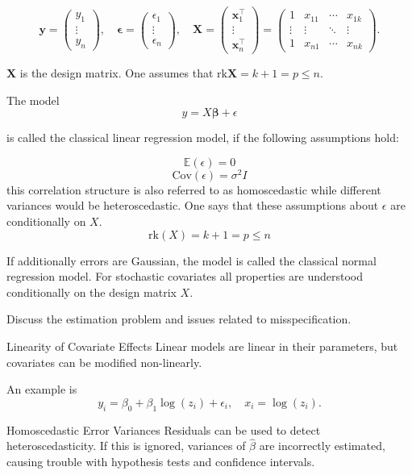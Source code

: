 \[ 
\mathbf{y} = \begin{pmatrix}
y_1 \\
\vdots \\
y_n
\end{pmatrix}, \quad \boldsymbol{\epsilon} = \begin{pmatrix}
\epsilon_1 \\
\vdots \\
\epsilon_n
\end{pmatrix}, \quad \mathbf{X} = \begin{pmatrix}
\mathbf{x}_1^\top \\
\vdots \\
\mathbf{x}_n^\top
\end{pmatrix} = \begin{pmatrix}
1 & x_{11} & \cdots & x_{1k} \\
\vdots & \vdots & \ddots & \vdots \\
1 & x_{n1} & \cdots & x_{nk}
\end{pmatrix}.
\]

\(\mathbf{X}\) is the design matrix. One assumes that \(\text{rk} \mathbf{X} = k + 1 = p \leq n\).


The model
\[ y = X \boldsymbol{\beta} + \epsilon \]

is called the classical linear regression model, if the following assumptions hold:

\[ \mathbb{E}(\epsilon) = 0 \]
\[ \text{Cov}(\epsilon) = \sigma^2 I \]
this correlation structure is also referred to as homoscedastic
while different variances would be heteroscedastic.
One says that these assumptions about \( \epsilon \) are conditionally on \( X \).
\[ \text{rk}(X) = k + 1 = p \leq n \]

If additionally errors are Gaussian, the model is called the classical normal regression model.
For stochastic covariates all properties are understood conditionally on the design matrix \(X\).


Discuss the estimation problem and issues related to misspecification.


Linearity of Covariate Effects
Linear models are linear in their parameters, but covariates can be modified non-linearly.

An example is 
\[ y_i = \beta_0 + \beta_1 \log(z_i) + \epsilon_i, \quad x_i = \log(z_i). \]

Homoscedastic Error Variances
Residuals can be used to detect heteroscedasticity.
If this is ignored, variances of \(\hat{\beta}\) are incorrectly estimated, causing trouble with hypothesis tests and confidence intervals.

